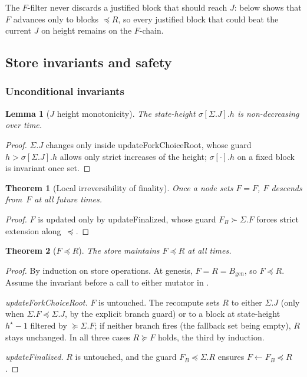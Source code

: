\ifx\litemode\undefined\documentclass{article}\fi
\newcommand{\genesis}{\ensuremath{B_{\mathrm{gen}}}}
\newcommand{\updateForkChoiceRoot}{\textsf{updateForkChoiceRoot}\xspace}
\newcommand{\updateFinalized}{\textsf{updateFinalized}\xspace}
\theoremstyle{plain}
\newtheorem{theorem}{Theorem}
\newtheorem{lemma}{Lemma}
\theoremstyle{definition}
\theoremstyle{remark}
\begin{document}
The $F$-filter never discards a justified block that should reach $J$:  below shows that $F$ advances only to blocks $\preceq R$, so every justified block that could beat the current $J$ on height remains on the $F$-chain.

\subsection{Store invariants and safety}

\subsubsection*{Unconditional invariants}

\begin{lemma}[$J$ height monotonicity]\label{lem:J-monotone}
The state-height $\sigma[\Sigma.J].h$ is non-decreasing over time.
\end{lemma}

\begin{proof}
$\Sigma.J$ changes only inside \updateForkChoiceRoot, whose guard $h > \sigma[\Sigma.J].h$ allows only strict increases of the height; $\sigma[\cdot].h$ on a fixed block is invariant once set.
\end{proof}

\begin{theorem}[Local irreversibility of finality]\label{thm:finperm}
Once a node sets $F = F$, $F$ descends from~$F$ at all future times.
\end{theorem}

\begin{proof}
$F$ is updated only by \updateFinalized, whose guard $F_B \succ \Sigma.F$ forces strict extension along~$\preceq$.
\end{proof}

\begin{theorem}[$F \preceq R$]\label{thm:fleqr}
The store maintains $F \preceq R$ at all times.
\end{theorem}

\begin{proof}
By induction on store operations.
At genesis, $F = R = \genesis$, so $F \preceq R$.
Assume the invariant before a call to either mutator in .

\emph{\updateForkChoiceRoot.}
$F$ is untouched. The recompute sets $R$ to either $\Sigma.J$ (only when $\Sigma.F \preceq \Sigma.J$, by the explicit branch guard) or to a block at state-height $h^\star - 1$ filtered by $\succeq \Sigma.F$; if neither branch fires (the fallback set being empty), $R$ stays unchanged. In all three cases $R \succeq F$ holds, the third by induction.

\emph{\updateFinalized.}
$R$ is untouched, and the guard $F_B \preceq \Sigma.R$ ensures $F \gets F_B \preceq R$.
\end{proof}
\end{document}
